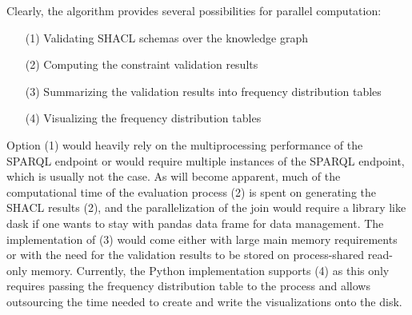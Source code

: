 Clearly, the algorithm provides several possibilities for parallel computation:
\begin{enumerate}
    \item[(1)] Validating SHACL schemas over the knowledge graph \label{parallelOption1}
    \item[(2)] Computing the constraint validation results \label{parallelOption2}
    \item[(3)] Summarizing the validation results into frequency distribution tables \label{parallelOption3}
    \item[(4)] Visualizing the frequency distribution tables \label{parallelOption4}
\end{enumerate}

Option (1) would heavily rely on the multiprocessing performance of the SPARQL endpoint or would require multiple instances of the SPARQL endpoint, which is usually not the case. As will become apparent, much of the computational time of the evaluation process (2) is spent on generating the SHACL results (2), and the parallelization of the join would require a library like dask \cite{dask} if one wants to stay with pandas data frame for data management. The implementation of (3) would come either with large main memory requirements or with the need for the validation results to be stored on process-shared read-only memory. 
Currently, the Python implementation supports (4) as this only requires passing the frequency distribution table to the process and allows outsourcing the time needed to create and write the visualizations onto the disk.






